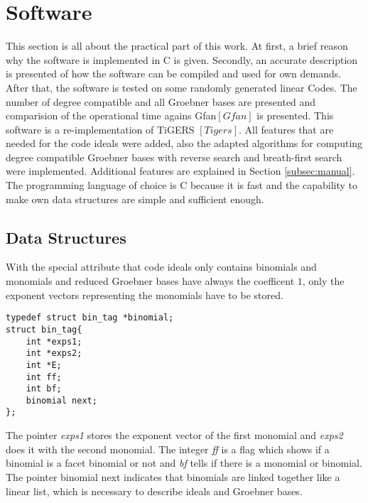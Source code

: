 \section{Software}
\label{sec:software}
This section is all about the practical part of this work. At first, a brief reason why the software is implemented in C is given. Secondly, an accurate description is presented of how the software can be compiled and used for own demands.
After that, the software is tested on some randomly generated linear Codes. The number of degree compatible and all Groebner bases are presented and comparision of the operational time agains Gfan$[Gfan]$ is presented.   \newline
This software is a re-implementation of TiGERS $[Tigers]$. All features that are needed for the code ideals were added, also the adapted algorithms for computing degree compatible Groebner bases with reverse search and breath-first search were implemented.   
Additional features are explained in Section \ref{subsec:manual}.
The programming language of choice is C because it is fast and the capability to make own data structures are simple and sufficient enough.

\subsection{Data Structures}
\label{subsec:datastructure}
With the special attribute that code ideals only contains binomials and monomials and reduced Groebner bases have always the coefficent $1$, only the exponent vectors representing the monomials have to be stored.


\begin{lstlisting} 
typedef struct bin_tag *binomial;
struct bin_tag{
    int *exps1;
    int *exps2;
    int *E;
    int ff;
    int bf;
    binomial next;
};

\end{lstlisting}

The pointer \emph{exps1} stores the exponent vector of the first monomial and \emph{exps2} does it with the second monomial.
The integer \emph{ff} is a flag which shows if a binomial is a facet binomial or not and \emph{bf} tells if there is a monomial or binomial.
The pointer binomial next indicates that binomials are linked together like a linear list, which is necessary to describe ideals and Groebner bases.\\

